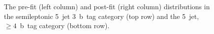 \begin{figure}
\begin{centering}
\caption[The pre-fit and post-fit distributions in the semileptonic 5-jet categories]{The pre-fit (left column) and post-fit (right column) distributions in the semileptonic 5~jet 3~b~tag category (top row) and the 5~jet, $\geq4$~b~tag category (bottom row).}
\label{fig:tth_postfit2}
\end{centering}
\end{figure}

\begin{figure}
\begin{centering}
 \\


\end{centering}
\end{figure}
